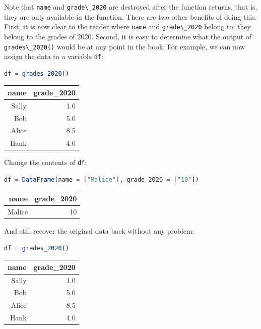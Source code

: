 \documentclass[
  notoc %
]{tufte-book}
\newcommand{\passthrough}[1]{#1}
\begin{document}
Note that \passthrough{\lstinline!name!} and
\passthrough{\lstinline!grade\_2020!} are destroyed after the function
returns, that is, they are only available in the function. There are two
other benefits of doing this. First, it is now clear to the reader where
\passthrough{\lstinline!name!} and \passthrough{\lstinline!grade\_2020!}
belong to: they belong to the grades of 2020. Second, it is easy to
determine what the output of \passthrough{\lstinline!grades\_2020()!}
would be at any point in the book. For example, we can now assign the
data to a variable \passthrough{\lstinline!df!}:

\begin{lstlisting}[language=Julia]
df = grades_2020()
\end{lstlisting}

\begin{longtable}[]{@{}rr@{}}
\toprule
name & grade\_2020 \\
\midrule
\endhead
Sally & 1.0 \\
Bob & 5.0 \\
Alice & 8.5 \\
Hank & 4.0 \\
\bottomrule
\end{longtable}

Change the contents of \passthrough{\lstinline!df!}:

\begin{lstlisting}[language=Julia]
df = DataFrame(name = ["Malice"], grade_2020 = ["10"])
\end{lstlisting}

\begin{longtable}[]{@{}rr@{}}
\toprule
name & grade\_2020 \\
\midrule
\endhead
Malice & 10 \\
\bottomrule
\end{longtable}

And still recover the original data back without any problem:

\begin{lstlisting}[language=Julia]
df = grades_2020()
\end{lstlisting}

\begin{longtable}[]{@{}rr@{}}
\toprule
name & grade\_2020 \\
\midrule
\endhead
Sally & 1.0 \\
Bob & 5.0 \\
Alice & 8.5 \\
Hank & 4.0 \\
\bottomrule
\end{longtable}
\end{document}
